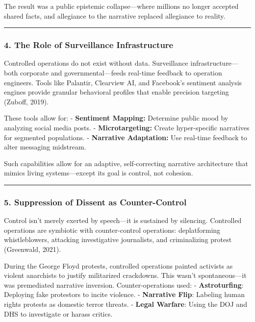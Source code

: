 \documentclass[
]{article}
\begin{document}
The result was a public epistemic collapse---where millions no longer accepted shared facts, and allegiance to the narrative replaced allegiance to reality.

\begin{center}\rule{0.5\linewidth}{0.5pt}\end{center}

\subsubsection{4. The Role of Surveillance Infrastructure}\label{the-role-of-surveillance-infrastructure}

Controlled operations do not exist without data. Surveillance infrastructure---both corporate and governmental---feeds real-time feedback to operation engineers. Tools like Palantir, Clearview AI, and Facebook's sentiment analysis engines provide granular behavioral profiles that enable precision targeting (Zuboff, 2019).

These tools allow for:
- \textbf{Sentiment Mapping:} Determine public mood by analyzing social media posts.
- \textbf{Microtargeting:} Create hyper-specific narratives for segmented populations.
- \textbf{Narrative Adaptation:} Use real-time feedback to alter messaging midstream.

Such capabilities allow for an adaptive, self-correcting narrative architecture that mimics living systems---except its goal is control, not cohesion.

\begin{center}\rule{0.5\linewidth}{0.5pt}\end{center}

\subsubsection{5. Suppression of Dissent as Counter-Control}\label{suppression-of-dissent-as-counter-control}

Control isn't merely exerted by speech---it is sustained by silencing. Controlled operations are symbiotic with counter-control operations: deplatforming whistleblowers, attacking investigative journalists, and criminalizing protest (Greenwald, 2021).

During the George Floyd protests, controlled operations painted activists as violent anarchists to justify militarized crackdowns. This wasn't spontaneous---it was premediated narrative inversion. Counter-operations used:
- \textbf{Astroturfing}: Deploying fake protestors to incite violence.
- \textbf{Narrative Flip}: Labeling human rights protests as domestic terror threats.
- \textbf{Legal Warfare}: Using the DOJ and DHS to investigate or harass critics.
\end{document}
